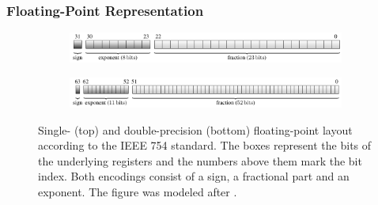 \documentclass{stdlocal}
\begin{document}

  \subsubsection*{Floating-Point Representation} %
  \label{sub:floating_point_representation}
    \begin{figure}
      \center
      \begin{subfigure}[b]{\textwidth}
        \center
        \includegraphics[width=\textwidth]{figures/floating-point_encoding_single.pdf}
      \end{subfigure}

      \begin{subfigure}[b]{\textwidth}
        \center
        \includegraphics[width=\textwidth]{figures/floating-point_encoding_double.pdf}
      \end{subfigure}
      \caption[Single- and Double-Precision Floating-Point Layout]{%
        Single- (top) and double-precision (bottom) floating-point layout according to the IEEE 754 standard.
        The boxes represent the bits of the underlying registers and the numbers above them mark the bit index.
        Both encodings consist of a sign, a fractional part and an exponent.
        The figure was modeled after \textcite[\ppno~197-198]{patterson2014}.
      }
      \label{fig:floating-point-encoding}
    \end{figure}
\end{document}
